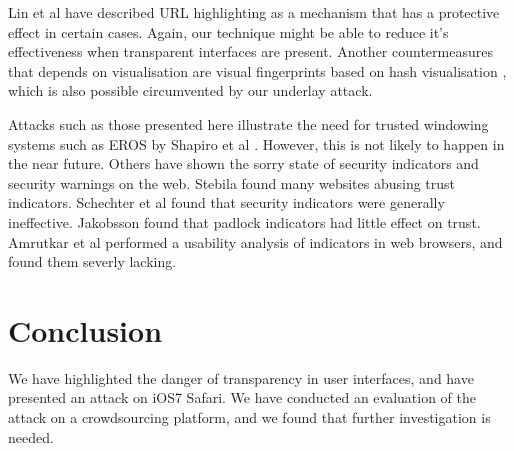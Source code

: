 \documentclass[twoside,letterpaper]{soups}
\begin{document}
Lin et al \cite{lin2007} have described URL highlighting as a mechanism that has a protective effect in certain cases. Again, our technique might be able to reduce it's effectiveness when transparent interfaces are present. Another countermeasures that depends on visualisation are visual fingerprints \cite{dhamija2005battle} based on hash visualisation \cite{visualisation}, which is also possible circumvented by our underlay attack.

Attacks such as those presented here illustrate the need for trusted windowing systems such as EROS by Shapiro et al \cite{shapiro2004design}. However, this is not likely to happen in the near future. Others have shown the sorry state of security indicators and security warnings on the web. Stebila \cite{misuse} found many websites abusing trust indicators. Schechter et al \cite{emperor} found that security indicators were generally ineffective. Jakobsson \cite{indicators} found that padlock indicators had little effect on trust. Amrutkar et al \cite{amrutkar2012measuring} performed a usability analysis of indicators in web browsers, and found them severly lacking. %




\section{Conclusion}\label{chap:conclusion}

We have highlighted the danger of transparency in user interfaces, and have presented an attack on iOS7 Safari. We have conducted an evaluation of the attack on a crowdsourcing platform, and we found that further investigation is needed.
\end{document}
